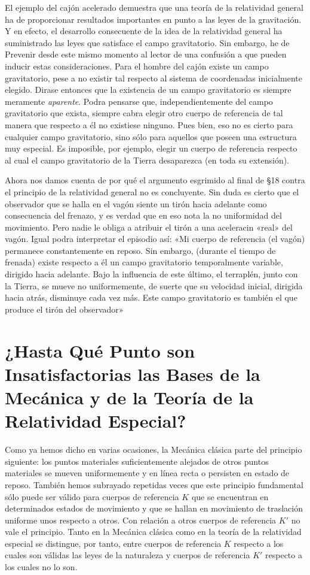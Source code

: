 \documentclass[spanish]{book}
\begin{document}
El ejemplo del cajón acelerado demuestra que una teoría de la relatividad general ha
de proporcionar resultados importantes en punto a las leyes de la gravitación. Y en
efecto, el desarrollo consecuente de la idea de la relatividad general ha suministrado
las leyes que satisface el campo gravitatorio. Sin embargo, he de Prevenir desde este
mismo momento al lector de una confusión a que pueden inducir estas
consideraciones. Para el hombre del cajón existe un campo gravitatorio, pese a no
existir tal respecto al sistema de coordenadas inicialmente elegido. Dirase entonces que
la existencia de un campo gravitatorio es siempre meramente \textit{aparente}. Podra
pensarse que, independientemente del campo gravitatorio que exista, siempre cabra
elegir otro cuerpo de referencia de tal manera que respecto a él no existiese ninguno.
Pues bien, eso no es cierto para cualquier campo gravitatorio, sino sólo para aquellos
que poseen una estructura muy especial. Es imposible, por ejemplo, elegir un cuerpo
de referencia respecto al cual el campo gravitatorio de la Tierra desaparezca (en toda
su extensión).

Ahora nos damos cuenta de por qué el argumento esgrimido al final de \S 18 contra
el principio de la relatividad general no es concluyente. Sin duda es cierto que el
observador que se halla en el vagón siente un tirón hacia adelante como consecuencia
del frenazo, y es verdad que en eso nota la no uniformidad del movimiento. Pero nadie
le obliga a atribuir el tirón a una aceleracin «real» del vagón. Igual podra
interpretar el episodio así: «Mi cuerpo de referencia (el vagón) permanece constantemente 
en reposo. Sin embargo, (durante el tiempo de frenada) existe respecto
a él un campo gravitatorio temporalmente variable, dirigido hacia adelante. Bajo la
influencia de este último, el terraplén, junto con la Tierra, se mueve no uniformemente,
de suerte que su velocidad inicial, dirigida hacia atrás, disminuye cada vez más.
Este campo gravitatorio es también el que produce el tirón del observador»


\chapter{¿Hasta Qué Punto son Insatisfactorias las Bases de la Mecánica y de la
Teoría de la Relatividad Especial?}

Como ya hemos dicho en varias ocasiones, la Mecánica clásica parte del principio
siguiente: los puntos materiales suficientemente alejados de otros puntos materiales se
mueven uniformemente y en línea recta o persisten en estado de reposo. También
hemos subrayado repetidas veces que este principio fundamental sólo puede ser
válido para cuerpos de referencia $K$ que se encuentran en determinados estados de
movimiento y que se hallan en movimiento de traslación uniforme unos respecto a
otros. Con relación a otros cuerpos de referencia $K'$ no vale el principio. Tanto en la
Mecánica clásica como en la teoría de la relatividad especial se distingue, por tanto,
entre cuerpos de referencia $K$ respecto a los cuales son válidas las leyes de la naturaleza
y cuerpos de referencia $K'$ respecto a los cuales no lo son.
\end{document}
